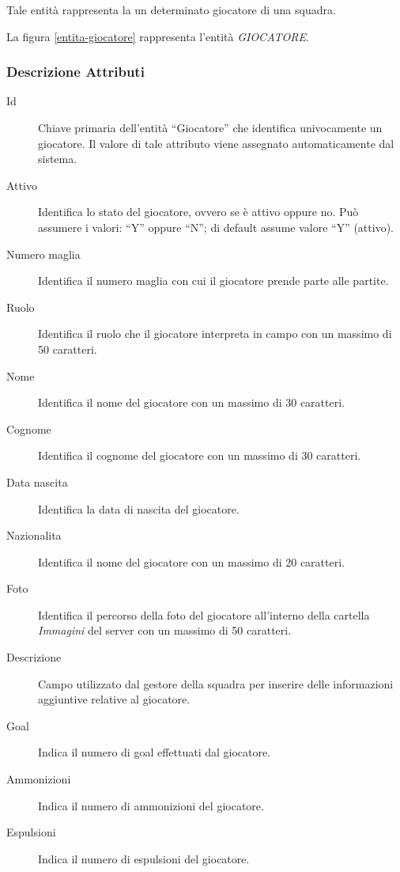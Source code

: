 		Tale entità rappresenta la un determinato giocatore di una squadra.
		
		La figura \ref{entita-giocatore} rappresenta l'entità \emph{GIOCATORE}.
		
		\subsubsection*{Descrizione Attributi}
		
		\begin{description}
			
			\item[Id]
			Chiave primaria dell'entità ``Giocatore'' che identifica univocamente un giocatore. Il valore di tale attributo viene assegnato automaticamente dal sistema.
			
			\item[Attivo]
			Identifica lo stato del giocatore, ovvero se è attivo oppure no. Può assumere i valori: ``Y'' oppure ``N''; di default assume valore ``Y'' (attivo).
			
			\item[Numero maglia]
			Identifica il numero maglia con cui il giocatore prende parte alle partite.
			
			\item[Ruolo]
			Identifica il ruolo che il giocatore interpreta in campo con un massimo di 50 caratteri.
			
			\item[Nome]
			Identifica il nome del giocatore con un massimo di 30 caratteri.
			
			\item[Cognome]
			Identifica il cognome del giocatore con un massimo di 30 caratteri.
			
			\item[Data nascita]
			Identifica la data di nascita del giocatore.
			
			\item[Nazionalita]
			Identifica il nome del giocatore con un massimo di 20 caratteri.
			
			\item[Foto]
			Identifica il percorso della foto del giocatore all'interno della cartella \emph{Immagini} del server con un massimo di 50 caratteri.
			
			\item[Descrizione]
			Campo utilizzato dal gestore della squadra per inserire delle informazioni aggiuntive relative al giocatore.
			
			\item[Goal]
			Indica il numero di goal effettuati dal giocatore.
			
			\item[Ammonizioni]
			Indica il numero di ammonizioni del giocatore.
			
			\item[Espulsioni]
			Indica il numero di espulsioni del giocatore.
			
		\end{description}
		
